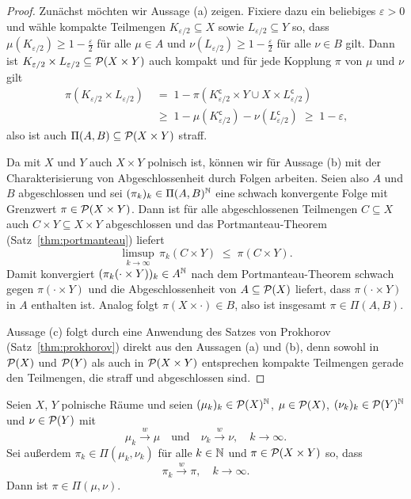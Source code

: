 \documentclass[../main/main.tex]{subfiles}
\begin{document}
	\begin{proof}
		Zunächst möchten wir Aussage (a) zeigen. Fixiere dazu ein beliebiges $\varepsilon > 0 $ und wähle kompakte Teilmengen $K_{\varepsilon/2} \subseteq X$ sowie $L_{\varepsilon/2} \subseteq Y$ so, dass $\mu(K_{\varepsilon/2}) \geq 1 - \frac{\varepsilon}{2}$ 
		für alle $\mu \in A$ und $\nu(L_{\varepsilon/2}) \geq 1 - \frac{\varepsilon}{2}$ für alle $\nu \in B$ gilt. Dann ist $K_{\varepsilon/2} \times L_{\varepsilon/2} \subseteq \mathcal{P}(X \times Y)$ auch kompakt und für jede Kopplung $\pi$ von $\mu$ und $\nu$ gilt
		\begin{align*}
			\pi(K_{\varepsilon/2} \times L_{\varepsilon/2}) \; &= \; 1 - \pi(K_{\varepsilon/2}^\mathsf{c} \times Y \cup X \times L_{\varepsilon/2}^\mathsf{c}) \\
			&\geq \; 1 - \mu(K_{\varepsilon/2}^\mathsf{c}) - \nu(L_{\varepsilon/2}^\mathsf{c}) \; \geq \; 1 - \varepsilon \text{,}
		\end{align*}
		also ist auch $\Pi(A, B) \subseteq \mathcal{P}(X \times Y)$ straff.
		
		Da mit $X$ und $Y$ auch $X \times Y$ polnisch ist, können wir für Aussage (b) mit der Charakterisierung von Abgeschlossenheit durch Folgen arbeiten.
		Seien also $A$ und $B$ abgeschlossen und sei $(\pi_k)_k \in \Pi(A, B)^{\mathbb{N}}$ eine schwach konvergente Folge mit Grenzwert $\pi \in \mathcal{P}(X \times Y)$.
		Dann ist für alle abgeschlossenen Teilmengen $C \subseteq X$ auch $C \times Y \subseteq X \times Y$ abgeschlossen und das Portmanteau-Theorem (Satz~\ref{thm:portmanteau}) liefert
		\[ \limsup_{k \to \infty} \, \pi_k(C \times Y) \; \leq \; \pi(C \times Y) \text{.} \]
		Damit konvergiert $(\pi_k(\cdot \times Y))_k \in A^{\mathbb{N}}$ nach dem Portmanteau-Theorem schwach gegen $\pi(\cdot \times Y)$ und die Abgeschlossenheit 
		von $A \subseteq \mathcal{P}(X)$ liefert, dass $\pi(\cdot \times Y)$ in $A$
		enthalten ist. Analog folgt $\pi(X \times \cdot) \in B$, also ist insgesamt $\pi \in \Pi(A, B)$.
		
		Aussage (c) folgt durch eine Anwendung des Satzes von Prokhorov (Satz~\ref{thm:prokhorov}) direkt aus den Aussagen (a) und (b), denn sowohl in $\mathcal{P}(X)$ und $\mathcal{P}(Y)$ als auch in $\mathcal{P}(X \times Y)$ entsprechen kompakte Teilmengen gerade den Teilmengen, die straff und abgeschlossen sind.
	\end{proof}

	\begin{Hilfssatz}
		Seien $X$, $Y$ polnische Räume und seien $(\mu_k)_k \in \mathcal{P}(X)^{\mathbb{N}}$, $\mu \in \mathcal{P}(X)$, $(\nu_k)_k \in \mathcal{P}(Y)^{\mathbb{N}}$ und $\nu \in \mathcal{P}(Y)$ mit
		\[ \mu_k \xrightarrow{w} \mu \quad \text{und} \quad \nu_k \xrightarrow{w} \nu, \quad k \to \infty \text{.} \]
		Sei außerdem $\pi_k \in \Pi(\mu_k, \nu_k)$ für alle $k \in \mathbb{N}$ und $\pi \in \mathcal{P}(X \times Y)$ so, dass
		\[ \pi_k \xrightarrow{w} \pi, \quad k \to \infty \text{.} \]
		Dann ist $\pi \in \Pi(\mu, \nu)$.
	\end{Hilfssatz}
\end{document}
